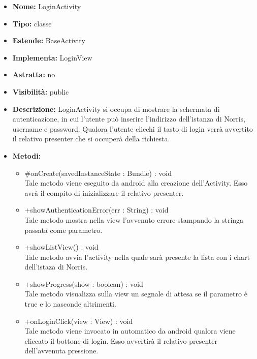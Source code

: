 			
			\begin{itemize}
			\item \textbf{Nome:} LoginActivity
			\item \textbf{Tipo:} classe
			
		\item \textbf{Estende:}
		BaseActivity
		\item \textbf{Implementa:}
		LoginView
		\item \textbf{Astratta:}
		no
			\item \textbf{Visibilità:} public
			\item \textbf{Descrizione:} LoginActivity si occupa di mostrare la schermata di autenticazione, in cui l'utente può inserire l'indirizzo dell'istanza di Norris, username e password. Qualora l'utente clicchi il tasto di login verrà avvertito il relativo presenter che si occuperà della richiesta.
			\item \textbf{Metodi:}
				\begin{itemize}
				\setlength{\itemsep}{5pt}
				
					\item[\ding{111}] {{\#onCreate(savedInstanceState : Bundle) : void}} \\ [1mm] Tale metodo viene eseguito da android alla creazione dell'Activity. Esso avrà il compito di inizializzare il relativo presenter. 
					\item[\ding{111}] {{+showAuthenticationError(err : String) : void}} \\ [1mm] Tale metodo mostra nella view l'avvenuto errore stampando la stringa passata come parametro.
					\item[\ding{111}] {{+showListView() : void}} \\ [1mm] Tale metodo avvia l'activity nella quale sarà presente la lista con i chart dell'istaza di Norris.
					\item[\ding{111}] {{+showProgress(show : boolean) : void}} \\ [1mm] Tale metodo visualizza sulla view un segnale di attesa se il parametro è true e lo nasconde altrimenti.
					\item[\ding{111}] {{+onLoginClick(view : View) : void}} \\ [1mm] Tale metodo viene invocato in automatico da android qualora viene cliccato il bottone di login. Esso avvertirà il relativo presenter dell'avvenuta pressione.
				\end{itemize}
		
			\end{itemize}

